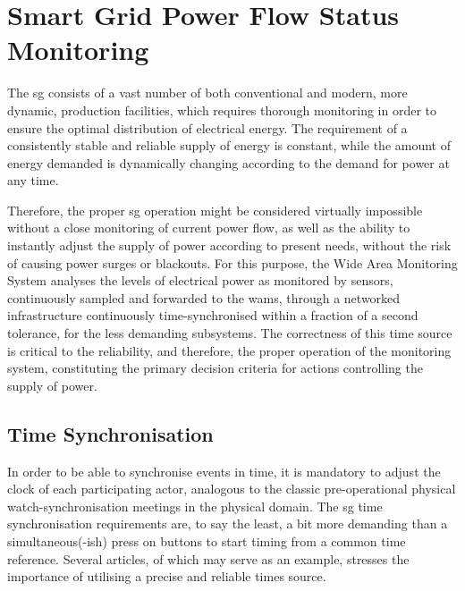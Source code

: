 \chapter{Smart Grid Power Flow Status Monitoring}

The \acrshort{sg} consists of a vast number of both conventional and modern, more dynamic, production facilities, which requires thorough monitoring in order to ensure the optimal distribution of electrical energy. The requirement of a consistently stable and reliable supply of energy is constant, while the amount of energy demanded is dynamically changing according to the demand for power at any time. 

Therefore, the proper \acrlong{sg} operation might be considered virtually impossible without a  close monitoring of current power flow, as well as the ability to instantly adjust the supply of power according to present needs,  without the risk of causing power surges or blackouts. For this purpose, the Wide Area Monitoring System analyses the levels of electrical power as monitored by sensors, continuously sampled and forwarded to the \acrshort{wams}, through  a networked infrastructure continuously time-synchronised within a fraction of a second tolerance, for the less demanding subsystems.
The correctness of this time source is critical to the reliability, and therefore, the proper operation of the monitoring system, constituting the primary decision criteria for actions controlling the supply of power.




\section{Time Synchronisation}

In order to be able to synchronise events in time, it is mandatory to adjust the clock of each participating actor, analogous to the classic pre-operational physical watch-synchronisation meetings in the physical domain. 
The \acrshort{sg} time synchronisation requirements are, to say the least, a bit more demanding than a simultaneous(-ish) press on buttons to start timing from a common time reference.
Several articles, of which \cite{appasani2018review} may serve as an example, stresses the importance of utilising a precise and reliable times source.

%





